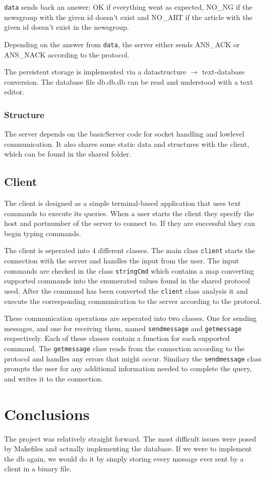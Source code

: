 \documentclass[12pt]{article}
\begin{document}
\verb!data! sends back an answer; OK if everything went as expected, NO\_NG if the newsgroup with the given id doesn't exist and NO\_ART if the article with the given id doesn't exist in the newsgroup.

Depending on the answer from \verb!data!, the server either sends ANS\_ACK or ANS\_NACK according to the protocol.

The persistent storage is implemented via a datastructure $\rightarrow$ text-database conversion. The database file db.db.db can be read and understood with a text editor.

\subsubsection*{Structure}
The server depends on the basicServer code for socket handling and lowlevel communication.
It also shares some static data and structures with the client, which can be found in the shared folder.


\subsection*{Client}
The client is designed as a simple terminal-based application that uses text commands to execute its queries. When a user starts the client they specify the host and portnumber of the server to connect to. If they are successful they can begin typing commands.

The client is seperated into 4 different classes. The main class \verb!client! starts the connection with the server and handles the input from the user. The input commands are checked in the class \verb!stringCmd! which contains a map converting supported commands into the enumerated values found in the shared protocol used. After the command has been converted the \verb!client! class analysis it and execute the corresponding communication to the server according to the protocol.

These communication operations are seperated into two classes. One for sending messages, and one for receiving them, named \verb!sendmessage! and \verb!getmessage! respectively. Each of these classes contain a function for each supported command. The \verb!getmessage! class reads from the connection according to the protocol and handles any errors that might occur. Similary the \verb!sendmessage! class prompts the user for any additional information needed to complete the query, and writes it to the connection.


\section{Conclusions}
The project was relatively straight forward. The most difficult issues were posed by Makefiles and actually implementing the database. If we were to implement the db again, we would do it by simply storing every message ever sent by a client in a binary file.
\end{document}
